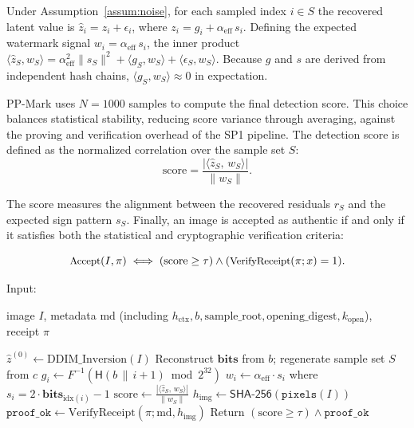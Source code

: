 \documentclass{article}
\theoremstyle{plain}
\theoremstyle{definition}
\theoremstyle{remark}
\begin{document}
Under Assumption~\ref{assum:noise}, for each sampled index \(i \in S\) the recovered
latent value is \(\hat{z}_i = z_i + \epsilon_i\), where \(z_i = g_i + \alpha_{\mathrm{eff}}\, s_i\). Defining the expected watermark signal \(w_i = \alpha_{\mathrm{eff}}\, s_i\), the inner product
\(\langle \hat{z}_S, w_S \rangle = \alpha_{\mathrm{eff}}^2 \|s_S\|^2 + \langle g_S, w_S\rangle + \langle \epsilon_S, w_S\rangle\).
Because \(g\) and \(s\) are derived from independent hash chains, \(\langle g_S, w_S\rangle \approx 0\) in expectation.
\label{eq:residual}

PP-Mark uses \(N = 1000\) samples to compute the final detection score. This choice balances
statistical stability, reducing score variance through averaging, against the proving and
verification overhead of the SP1 pipeline. The detection score is defined as the normalized
correlation over the sample set \(S\):
\begin{equation}
\mathrm{score}
= \frac{|\langle \hat{z}_S,\, w_S \rangle|}{\|w_S\|}.
\end{equation}

The score measures the alignment between the recovered residuals \(r_S\) and the expected
sign pattern \(s_S\). Finally, an image is accepted as authentic if and only if it satisfies
both the statistical and cryptographic verification criteria:

\begin{equation}
{\small
\text{Accept}(I,\pi)\iff (\mathrm{score}\ge\tau)\land(\text{VerifyReceipt}(\pi; x)=1).
}
\end{equation}


\begin{algorithm}[t]
\caption{Verify and Extract}
\label{alg:verify}
\begin{algorithmic}[1]
\STATE Input:
\parbox[t]{0.85\linewidth}{
image \(I\), metadata \(\mathrm{md}\) (including \(h_{\mathrm{ctx}}, b,
\mathrm{sample\_root}, \mathrm{opening\_digest}, k_{\mathrm{open}}\)), receipt \(\pi\)
}
\STATE \(\hat{z}^{(0)} \leftarrow \text{DDIM\_Inversion}(I)\)
\STATE Reconstruct \(\mathbf{bits}\) from \(b\); regenerate sample set \(S\) from \(c\)
  \STATE \(g_i \leftarrow F^{-1}(\mathsf{H}(b \,\|\, i{+}1) \bmod 2^{32})\)
  \STATE \(w_i \leftarrow \alpha_{\mathrm{eff}} \cdot s_i\) where \(s_i = 2 \cdot \mathbf{bits}_{\mathrm{idx}(i)} - 1\)
\ENDFOR
\STATE \(\mathrm{score} \leftarrow \frac{|\langle \hat{z}_S,\, w_S \rangle|}{\|w_S\|}\)
\STATE \(h_{\mathrm{img}} \leftarrow \mathsf{SHA\text{-}256}(\texttt{pixels}(I))\) 
\STATE \(\texttt{proof\_ok} \leftarrow \text{VerifyReceipt}(\pi; \mathrm{md}, h_{\mathrm{img}})\)
\STATE Return \((\mathrm{score} \ge \tau) \land \texttt{proof\_ok}\)
\end{algorithmic}
\end{algorithm}
\end{document}
